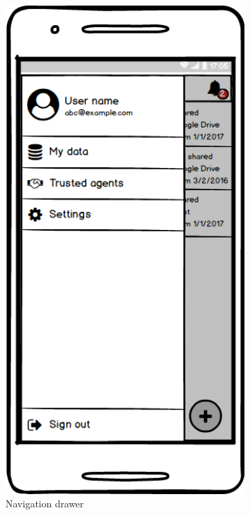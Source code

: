 \documentclass[conference]{IEEEtran}
\begin{document}
\begin{figure}[t]
\begin{subfigure}{0.24\textwidth}
	\includegraphics[width=0.95\linewidth]{screen3.png}
	\caption{Navigation drawer}
	\label{fig:screen3}
	\end{subfigure}
	\begin{subfigure}{0.24\textwidth}

\end{subfigure}
\end{figure}
\end{document}
